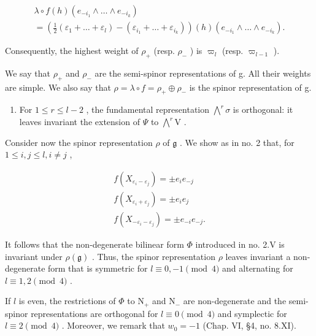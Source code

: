 \[
\begin{array}{l} \lambda \circ f (h) (e _ {- i _ {1}} \wedge \dots \wedge e _ {- i _ {k}}) \\ = (\frac {1}{2} (\varepsilon_ {1} + \dots + \varepsilon_ {l}) - (\varepsilon_ {i _ {1}} + \dots + \varepsilon_ {i _ {k}})) (h) (e _ {- i _ {1}} \wedge \dots \wedge e _ {- i _ {k}}). \end{array}
\]

Consequently, the highest weight of \(\rho_{+}\) (resp. \(\rho_{-}\) ) is \(\varpi_{l}\) (resp. \(\varpi_{l-1}\) ).

We say that \(\rho_{+}\) and \(\rho_{-}\) are the semi-spinor representations of g. All their weights are simple. We also say that \(\rho = \lambda \circ f = \rho_{+} \oplus \rho_{-}\) is the spinor representation of g.

\begin{enumerate}
\def\labelenumi{(\Alph{enumi})}
\setcounter{enumi}{21}
\tightlist
\item
  For \(1 \leq r \leq l - 2\) , the fundamental representation \(\bigwedge^{r} \sigma\) is orthogonal: it leaves invariant the extension of \(\varPsi\) to \(\bigwedge^{r} \mathrm{V}\) .
\end{enumerate}

Consider now the spinor representation \(\rho\) of \(\mathfrak{g}\) . We show as in no. 2 that, for \(1 \leq i, j \leq l, i \neq j\) ,

\[
\begin{array}{r} f (X _ {\varepsilon_ {i} - \varepsilon_ {j}}) = \pm e _ {i} e _ {- j} \\ f (X _ {\varepsilon_ {i} + \varepsilon_ {j}}) = \pm e _ {i} e _ {j} \\ f (X _ {- \varepsilon_ {i} - \varepsilon_ {j}}) = \pm e _ {- i} e _ {- j}. \end{array}
\]

It follows that the non-degenerate bilinear form \(\varPhi\) introduced in no. 2.V is invariant under \(\rho(\mathfrak{g})\) . Thus, the spinor representation \(\rho\) leaves invariant a non-degenerate form that is symmetric for \(l \equiv 0, -1 \pmod{4}\) and alternating for \(l \equiv 1, 2 \pmod{4}\) .

If \(l\) is even, the restrictions of \(\varPhi\) to \(\mathrm{N}_{+}\) and \(\mathrm{N}_{-}\) are non-degenerate and the semi-spinor representations are orthogonal for \(l \equiv 0 \pmod{4}\) and symplectic for \(l \equiv 2 \pmod{4}\) . Moreover, we remark that \(w_{0} = -1\) (Chap. VI, §4, no. 8.XI).

